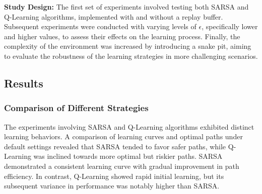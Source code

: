 \documentclass[12pt]{article}
\begin{document}
\textbf{Study Design:}
The first set of experiments involved testing both SARSA and Q-Learning algorithms, implemented with and without a replay buffer. Subsequent experiments were conducted with varying levels of \(\epsilon\), specifically lower and higher values, to assess their effects on the learning process. Finally, the complexity of the environment was increased by introducing a snake pit, aiming to evaluate the robustness of the learning strategies in more challenging scenarios.


\subsection{Results}

\subsubsection{Comparison of Different Strategies}
The experiments involving SARSA and Q-Learning algorithms exhibited distinct learning behaviors. A comparison of learning curves and optimal paths under default settings revealed that SARSA tended to favor safer paths, while Q-Learning was inclined towards more optimal but riskier paths. SARSA demonstrated a consistent learning curve with gradual improvement in path efficiency. In contrast, Q-Learning showed rapid initial learning, but its subsequent variance in performance was notably higher than SARSA.
\end{document}
